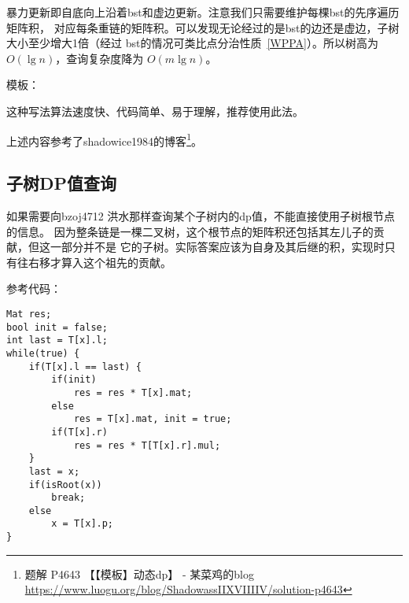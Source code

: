 暴力更新即自底向上沿着bst和虚边更新。注意我们只需要维护每棵bst的先序遍历矩阵积，
对应每条重链的矩阵积。可以发现无论经过的是bst的边还是虚边，子树大小至少增大1倍（经过
bst的情况可类比点分治性质~\ref{WPPA}）。所以树高为$O(\lg n)$，查询复杂度降为
$O(m\lg n)$。

模板：


这种写法算法速度快、代码简单、易于理解，推荐使用此法。

上述内容参考了shadowice1984的博客\footnote{
    题解 P4643 【【模板】动态dp】 - 某菜鸡的blog\\
    \url{https://www.luogu.org/blog/ShadowassIIXVIIIIV/solution-p4643}
}。

\subsection{子树DP值查询}
如果需要向bzoj4712 洪水那样查询某个子树内的dp值，不能直接使用子树根节点的信息。
因为整条链是一棵二叉树，这个根节点的矩阵积还包括其左儿子的贡献，但这一部分并不是
它的子树。实际答案应该为自身及其后继的积，实现时只有往右移才算入这个祖先的贡献。

参考代码：
\begin{lstlisting}
Mat res;
bool init = false;
int last = T[x].l;
while(true) {
    if(T[x].l == last) {
        if(init)
            res = res * T[x].mat;
        else
            res = T[x].mat, init = true;
        if(T[x].r)
            res = res * T[T[x].r].mul;
    }
    last = x;
    if(isRoot(x))
        break;
    else
        x = T[x].p;
}
\end{lstlisting}
